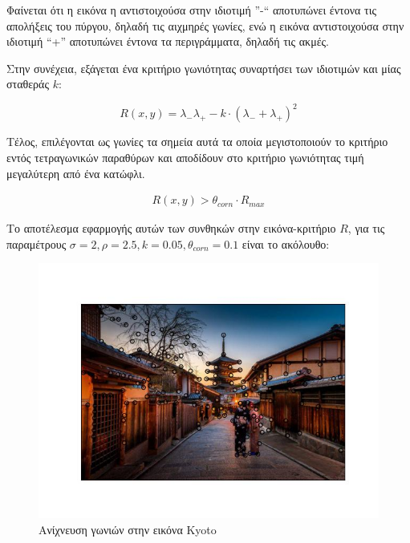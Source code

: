 \documentclass{article}
\newcommand{\eng}[1]{\foreignlanguage{english}{#1}}
\begin{document}
Φαίνεται ότι η εικόνα η αντιστοιχούσα στην ιδιοτιμή ''-`` αποτυπώνει έντονα τις απολήξεις του πύργου, δηλαδή τις αιχμηρές γωνίες, ενώ η εικόνα αντιστοιχούσα στην ιδιοτιμή ``+'' αποτυπώνει έντονα τα περιγράμματα, δηλαδή τις ακμές.

Στην συνέχεια, εξάγεται ένα κριτήριο γωνιότητας συναρτήσει των ιδιοτιμών και μίας σταθεράς $k$:

\begin{equation}
    R(x, y) = \lambda_{-}\lambda_{+} - k\cdot\left(\lambda_{-} + \lambda_{+}\right)^2
\end{equation}

Τέλος, επιλέγονται ως γωνίες τα σημεία αυτά τα οποία μεγιστοποιούν το κριτήριο εντός τετραγωνικών παραθύρων και αποδίδουν στο κριτήριο γωνιότητας τιμή μεγαλύτερη από ένα κατώφλι.

\begin{equation}
    \begin{gathered}
        R(x, y) > \theta_{corn} \cdot R_{max} 
    \end{gathered}
\end{equation}

Το αποτέλεσμα εφαρμογής αυτών των συνθηκών στην εικόνα-κριτήριο $R$, για τις παραμέτρους $\sigma = 2, \rho = 2.5, k = 0.05, \theta_{corn} = 0.1$ είναι το ακόλουθο:
       

\begin{figure}[h]
    \centering
    \includegraphics[width=\textwidth]{image-plots/corner-detection.jpg}
    \caption{Ανίχνευση γωνιών στην εικόνα \eng{Kyoto}}
    \label{fig:kyoto-corners}
\end{figure}
\FloatBarrier
\end{document}
